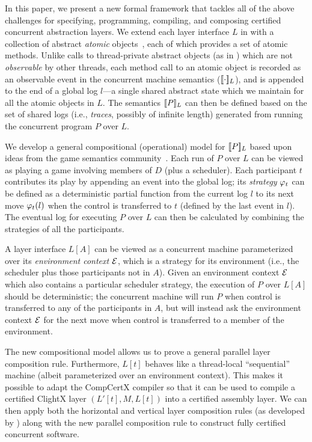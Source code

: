 In this paper, we present a new formal framework that tackles all of
the above challenges for specifying, programming, compiling, and
composing certified concurrent abstraction layers. We extend each
layer interface $L$ in \citet{dscal15} with a collection of abstract
{\em atomic} objects~\cite{Herlihy08book}, each of which provides a
set of atomic methods. Unlike calls to thread-private abstract objects
(as in \cite{dscal15}) which are not {\em observable} by other
threads, each method call to an atomic object is recorded as an 
observable event in the concurrent machine semantics
($\sem{L}{\cdot}$), and is appended to the end of a global log $l$---a
single shared abstract state which we maintain for all the atomic
objects in $L$. The semantics $\sem{L}{P}$ can then be defined based
on the set of shared logs (i.e., {\em{}traces}, possibly of
infinite length) generated from running the concurrent program $P$
over $L$.

We develop a general compositional (operational) model for
$\sem{L}{P}$ based upon ideas from the game semantics
community~\cite{gsinvite}. Each run of $P$ over $L$ can be viewed as
playing a game involving members of $D$ (plus a scheduler). Each
participant $t$ contributes its play by appending an event into the
global log; its {\em strategy} $\strat{t}$ can be defined as a
deterministic partial function from the current log $l$ to its next
move $\strat{t}(l)$ when the control is transferred to $t$
(defined by the last event in $l$). The
eventual log for executing $P$ over $L$ can then be calculated by
combining the strategies of all the participants.

A layer interface $L[A]$ can be viewed as a concurrent machine
parameterized over its {\em environment context} $\oracle$, which is a
strategy for its environment (i.e., the scheduler plus those
participants not in $A$).  Given an environment context $\oracle$
which also contains a particular scheduler strategy, the execution of
$P$ over $L[A]$ should be deterministic; the concurrent machine will
run $P$ when control is transferred to any of the participants in $A$, but
will instead ask the environment context $\oracle$ for the next move when 
control is transferred to a member of the environment.

The new compositional model allows us to prove a general parallel
layer composition rule. Furthermore, $L[t]$ behaves like a
thread-local ``sequential'' machine (albeit parameterized over an
environment context).  This makes it possible to adapt the CompCertX
compiler so that it can be used to compile a certified ClightX layer
$(L'[t],M,L[t])$ into a certified assembly layer. We can then apply
both the horizontal and vertical layer composition rules (as developed
by \citet{dscal15}) along with the new parallel composition rule to 
construct fully certified concurrent software.
 
